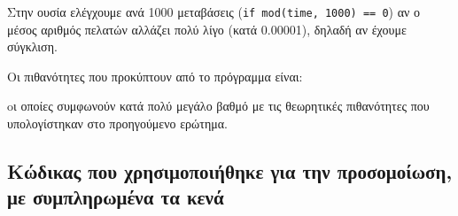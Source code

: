 \documentclass[a4paper]{article}
\begin{document}
Στην ουσία ελέγχουμε ανά 1000 μεταβάσεις (\texttt{if mod(time, 1000) == 0}) αν ο μέσος αριθμός πελατών αλλάζει πολύ λίγο (κατά 0.00001), δηλαδή αν έχουμε σύγκλιση.  

Οι πιθανότητες που προκύπτουν από το πρόγραμμα είναι:



oι οποίες συμφωνούν κατά πολύ μεγάλο βαθμό με τις θεωρητικές πιθανότητες που υπολογίστηκαν στο προηγούμενο ερώτημα.

\subsection*{Κώδικας που χρησιμοποιήθηκε για την προσομοίωση, με συμπληρωμένα τα κενά}


\end{document}

